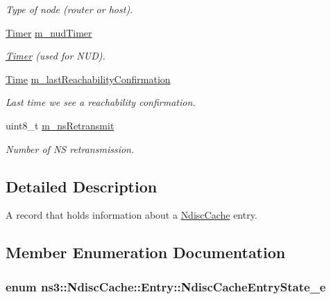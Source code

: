 \begin{DoxyCompactItemize}
\begin{DoxyCompactList}\small\item\em Type of node (router or host). \end{DoxyCompactList}\item 
\hyperlink{classns3_1_1Timer}{Timer} \hyperlink{classns3_1_1NdiscCache_1_1Entry_ad81790b631a991bdecc6d9ff4d86ad9d}{m\+\_\+nud\+Timer}
\begin{DoxyCompactList}\small\item\em \hyperlink{classns3_1_1Timer}{Timer} (used for N\+UD). \end{DoxyCompactList}\item 
\hyperlink{classns3_1_1Time}{Time} \hyperlink{classns3_1_1NdiscCache_1_1Entry_a68efcbbc4f8553d5a962b23fea1a2da4}{m\+\_\+last\+Reachability\+Confirmation}
\begin{DoxyCompactList}\small\item\em Last time we see a reachability confirmation. \end{DoxyCompactList}\item 
uint8\+\_\+t \hyperlink{classns3_1_1NdiscCache_1_1Entry_a54e66d2227da0181d02474d51fad198f}{m\+\_\+ns\+Retransmit}
\begin{DoxyCompactList}\small\item\em Number of NS retransmission. \end{DoxyCompactList}\end{DoxyCompactItemize}


\subsection{Detailed Description}
A record that holds information about a \hyperlink{classns3_1_1NdiscCache}{Ndisc\+Cache} entry. 

\subsection{Member Enumeration Documentation}
\subsubsection[{\texorpdfstring{Ndisc\+Cache\+Entry\+State\+\_\+e}{NdiscCacheEntryState_e}}]{\setlength{\rightskip}{0pt plus 5cm}enum {\bf ns3\+::\+Ndisc\+Cache\+::\+Entry\+::\+Ndisc\+Cache\+Entry\+State\+\_\+e}\hspace{0.3cm}{\ttfamily [private]}}\hypertarget{classns3_1_1NdiscCache_1_1Entry_a18d0994b494f15432f9e02da84c69def}{}\label{classns3_1_1NdiscCache_1_1Entry_a18d0994b494f15432f9e02da84c69def}


